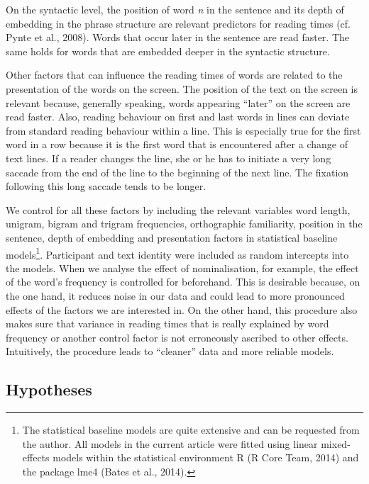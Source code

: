 \documentclass[output=paper]{langsci/langscibook}
\begin{document}
On the syntactic level, the position of word \textit{n} in the sentence and its depth of embedding in the phrase structure are relevant predictors for reading times (cf. Pynte et al., 2008). Words that occur later in the sentence are read faster. The same holds for words that are embedded deeper in the syntactic structure.

Other factors that can influence the reading times of words are related to the presentation of the words on the screen. The position of the text on the screen is relevant because, generally speaking, words appearing “later” on the screen are read faster. Also, reading behaviour on first and last words in lines can deviate from standard reading behaviour within a line. This is especially true for the first word in a row because it is the first word that is encountered after a change of text lines. If a reader changes the line, she or he has to initiate a very long saccade from the end of the line to the beginning of the next line. The fixation following this long saccade tends to be longer.

We control for all these factors by including the relevant variables word length, unigram, bigram and trigram frequencies, orthographic familiarity, position in the sentence, depth of embedding and presentation factors in statistical baseline models\footnote{The statistical baseline models are quite extensive and can be requested from the author. All models in the current article were fitted using linear mixed-effects models within the statistical environment R (R Core Team, 2014) and the package lme4 (Bates et al., 2014).}. Participant and text identity were included as random intercepts into the models. When we analyse the effect of nominalisation, for example, the effect of the word’s frequency is controlled for beforehand. This is desirable because, on the one hand, it reduces noise in our data and could lead to more pronounced effects of the factors we are interested in. On the other hand, this procedure also makes sure that variance in reading times that is really explained by word frequency or another control factor is not erroneously ascribed to other effects. Intuitively, the procedure leads to “cleaner” data and more reliable models. 

\subsection{\label{bkm:Ref283726131}Hypotheses}
\end{document}
